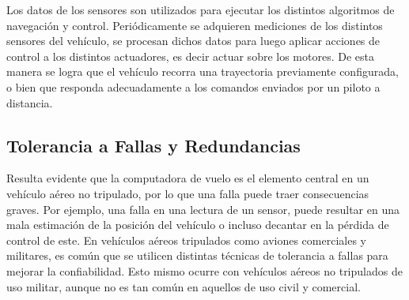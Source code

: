 Los datos de los sensores son utilizados para ejecutar los distintos algoritmos de navegación y control. Periódicamente se adquieren mediciones de los distintos sensores del vehículo, se procesan dichos datos para luego aplicar acciones de control a los distintos actuadores, es decir actuar sobre los motores. De esta manera se logra que el vehículo recorra una trayectoria previamente configurada, o bien que responda adecuadamente a los comandos enviados por un piloto a distancia.






\subsection{Tolerancia a Fallas y Redundancias}

Resulta evidente que la computadora de vuelo es el elemento central en un vehículo aéreo no tripulado, por lo que una falla puede traer consecuencias graves. Por ejemplo, una falla en una lectura de un sensor, puede resultar en una mala estimación de la posición del vehículo o incluso decantar en la pérdida de control de este. En vehículos aéreos tripulados como aviones comerciales y militares, es común que se utilicen distintas técnicas de tolerancia a fallas para mejorar la confiabilidad. Esto mismo ocurre con vehículos aéreos no tripulados de uso militar, aunque no es tan común en aquellos de uso civil y comercial. 

